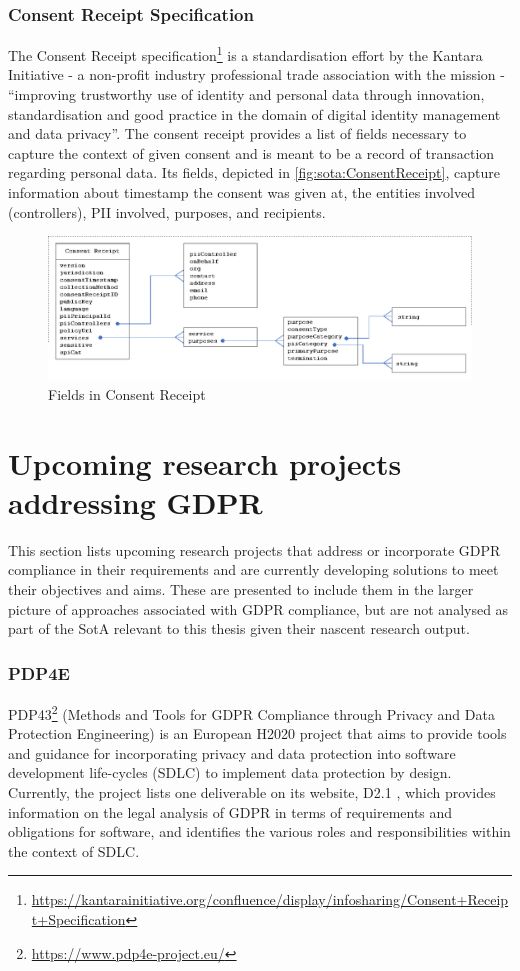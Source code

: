 \subsubsection{Consent Receipt Specification}
The Consent Receipt specification\footnote{\url{https://kantarainitiative.org/confluence/display/infosharing/Consent+Receipt+Specification}} \cite{lizar_consent_2017} is a standardisation effort by the Kantara Initiative - a non-profit industry professional trade association with the mission - ``improving trustworthy use of identity and personal data through innovation, standardisation and good practice in the domain of digital identity management and data privacy''. The consent receipt provides a list of fields necessary to capture the context of given consent and is meant to be a record of transaction regarding personal data. Its fields, depicted in \autoref{fig:sota:ConsentReceipt}, capture information about timestamp the consent was given at, the entities involved (controllers), PII involved, purposes, and recipients.
\begin{figure}[htbp]
    \centering
    \includegraphics[width=\linewidth]{img/ConsentReceipt.png}
    \caption{Fields in Consent Receipt \cite{lizar_consent_2017}}
    \label{fig:sota:ConsentReceipt}
\end{figure}

\section{Upcoming research projects addressing GDPR}
This section lists upcoming research projects that address or incorporate GDPR compliance in their requirements and are currently developing solutions to meet their objectives and aims. These are presented to include them in the larger picture of approaches associated with GDPR compliance, but are not analysed as part of the SotA relevant to this thesis given their nascent research output.

\subsubsection{PDP4E}
PDP43\footnote{\url{https://www.pdp4e-project.eu/}} (Methods and Tools for GDPR Compliance through Privacy and Data Protection Engineering) is an European H2020 project that aims to provide tools and guidance for incorporating privacy and data protection into software development life-cycles (SDLC) to implement data protection by design. Currently, the project lists one deliverable on its website, D2.1 \cite{noauthor_d2.1_2019}, which provides information on the legal analysis of GDPR in terms of requirements and obligations for software, and identifies the various roles and responsibilities within the context of SDLC.

